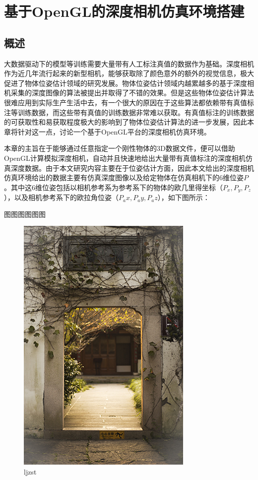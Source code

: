 \chapter{基于OpenGL的深度相机仿真环境搭建}

\section{概述}
大数据驱动下的模型等训练需要大量带有人工标注真值的数据作为基础。深度相机作为近几年流行起来的新型相机，能够获取除了颜色意外的额外的视觉信息，极大促进了物体位姿估计领域的研究发展。物体位姿估计领域内越累越多的基于深度相机采集的深度图像的算法被提出并取得了不错的效果。但是这些物体位姿估计算法很难应用到实际生产生活中去，有一个很大的原因在于这些算法都依赖带有真值标注等训练数据，而这些带有真值的训练数据非常难以获取。有真值标注的训练数据的可获取性和易获取程度极大的影响到了物体位姿估计算法的进一步发展，因此本章将针对这一点，讨论一个基于OpenGL平台的深度相机仿真环境。

本章的主旨在于能够通过任意指定一个刚性物体的3D数据文件，便可以借助OpenGL计算模拟深度相机，自动并且快速地给出大量带有真值标注的深度相机仿真深度数据。由于本文研究内容主要在于位姿估计方面，因此本文给出的深度相机仿真环境给出的数据主要有仿真深度图像以及给定物体在仿真相机下的6维位姿$P$。其中这6维位姿包括以相机参考系为参考系下的物体的欧几里得坐标（$P_x,P_y,P_z$），以及相机参考系下的欧拉角位姿（$P_ax,P_ay,P_az$），如下图所示：

图图图图图图
\begin{figure}[htb]
	\centering 
	\includegraphics[scale=1.0]{./Pictures/test.jpg} 
	\caption{ljzst} 
\end{figure}

